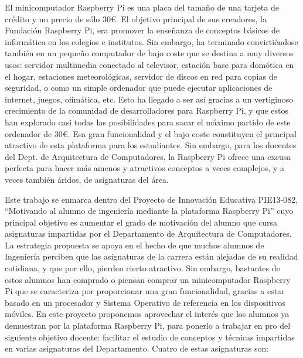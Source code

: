 
El minicomputador Raspberry Pi es una placa del tamaño de una tarjeta de crédito y un
precio de sólo 30€. El objetivo principal de sus creadores, la Fundación Raspberry Pi,
era promover la enseñanza de conceptos básicos de informática en los colegios e institutos.
Sin embargo, ha terminado convirtiéndose también en un pequeño computador de bajo
coste que se destina a muy diversos usos: servidor multimedia conectado al televisor,
estación base para domótica en el hogar, estaciones meteorológicas, servidor de discos
en red para copias de seguridad, o como un simple ordenador que puede ejecutar
aplicaciones de internet, juegos, ofimática, etc. Esto ha llegado a ser así gracias
a un vertiginoso crecimiento de la comunidad de desarrolladores para Raspberry Pi,
y que estos han explorado casi todas las posibilidades para sacar el máximo partido
de este ordenador de 30€. Esa gran funcionalidad y el bajo coste constituyen el
principal atractivo de esta plataforma para los estudiantes. Sin embargo, para los
docentes del Dept. de Arquitectura de Computadores, la Raspberry Pi ofrece una excusa
perfecta para hacer más amenos y atractivos conceptos a veces complejos, y a veces
también áridos, de asignaturas del área.

Este trabajo se enmarca dentro del Proyecto de Innovación Educativa PIE13-082, ``Motivando
al alumno de ingeniería mediante la plataforma Raspberry Pi'' cuyo principal objetivo es
aumentar el grado de motivación del alumno que cursa asignaturas impartidas por el
Departamento de Arquitectura de Computadores. La estrategia propuesta se apoya en el
hecho de que muchos alumnos de Ingeniería perciben que las asignaturas de la carrera
están alejadas de su realidad cotidiana, y que por ello, pierden cierto atractivo. Sin
embargo, bastantes de estos alumnos han comprado o piensan comprar un minicomputador
Raspberry Pi que se caracteriza por proporcionar una gran funcionalidad, gracias a
estar basado en un procesador y Sistema Operativo de referencia en los dispositivos
móviles. En este proyecto proponemos aprovechar el interés que los alumnos ya
demuestran por la plataforma Raspberry Pi, para ponerlo a trabajar en pro del
siguiente objetivo docente: facilitar el estudio de conceptos y técnicas impartidas
en varias asignaturas del Departamento. Cuatro de estas asignaturas son:

